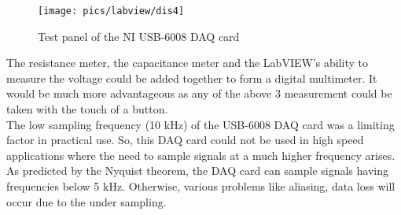 \pagebreak

\begin{figure}[!h]
	\centering
	\texttt{[image: pics/labview/dis4]}
	\caption{Test panel of the NI USB-6008 DAQ card}
	\label{fig:dis4}
\end{figure}

\noindent
The resistance meter, the capacitance meter and the LabVIEW's ability to measure the voltage could be added together to form a digital multimeter. It would be much more advantageous as any of the above 3 measurement could be taken with the touch of a button. \\

\noindent
The low sampling frequency (10 kHz) of the USB-6008 DAQ card was a limiting factor in practical use. So, this DAQ card could not be used in high speed applications where the need to sample signals at a much higher frequency arises. As predicted by the Nyquist theorem, the DAQ card can sample signals having frequencies below 5 kHz. Otherwise, various problems like aliasing, data loss will  occur due to the under sampling.